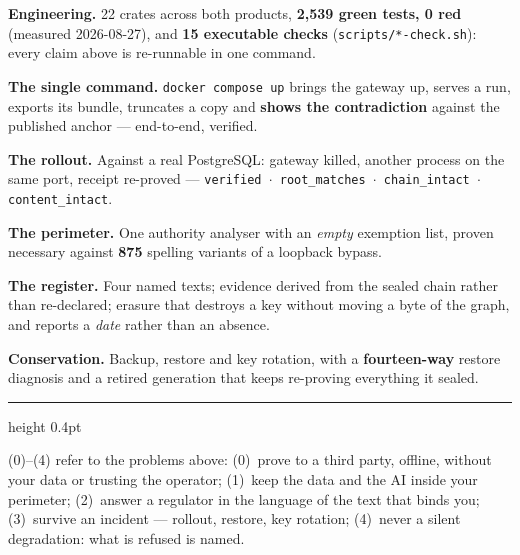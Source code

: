 \documentclass[10pt]{article}
\newcommand{\hd}[1]{\vspace{3.5pt}{\color{efenavy}\large\bfseries #1}\par\vspace{1.5pt}}
\begin{document}
\hd{Measured}
\begin{tight}
\item \textbf{Engineering.} 22 crates across both products, \textbf{2{,}539 green tests, 0 red}
(measured 2026-08-27), and \textbf{15 executable checks} (\texttt{scripts/*-check.sh}): every claim
above is re-runnable in one command.
\item \textbf{The single command.} \texttt{docker compose up} brings the gateway up, serves a run,
exports its bundle, truncates a copy and \textbf{shows the contradiction} against the published
anchor --- end-to-end, verified.
\item \textbf{The rollout.} Against a real PostgreSQL: gateway killed, another process on the same
port, receipt re-proved --- \texttt{verified $\cdot$ root\_matches $\cdot$ chain\_intact $\cdot$
content\_intact}.
\item \textbf{The perimeter.} One authority analyser with an \emph{empty} exemption list, proven
necessary against \textbf{875} spelling variants of a loopback bypass.
\item \textbf{The register.} Four named texts; evidence derived from the sealed chain rather than
re-declared; erasure that destroys a key without moving a byte of the graph, and reports a
\emph{date} rather than an absence.
\item \textbf{Conservation.} Backup, restore and key rotation, with a \textbf{fourteen-way}
restore diagnosis and a retired generation that keeps re-proving everything it sealed.
\end{tight}

\enlargethispage{4\baselineskip}
\vspace{3pt}
{\color{efegray}\hrule height 0.4pt}
\vspace{2pt}
{\scriptsize\color{efegray}(0)--(4) refer to the problems above: (0)~prove to a third party, offline, without your data or trusting the operator; (1)~keep the data and the AI inside your perimeter; (2)~answer a regulator in the language of the text that binds you; (3)~survive an incident --- rollout, restore, key rotation; (4)~never a silent degradation: what is refused is named.}
\end{document}
